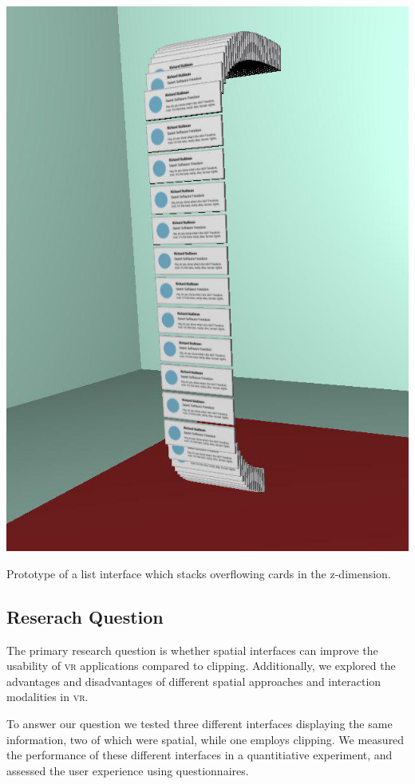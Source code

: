 \documentclass{tufte-book} %
\begin{document}
\begin{marginfigure}
  \includegraphics[width=\linewidth]{email.png}
  \caption{Prototype of a list interface which stacks overflowing cards in the z-dimension.}
  \label{fig:email}
\end{marginfigure}

\subsection{Reserach Question}
The primary research question is whether spatial interfaces can improve the usability of \textsc{vr} applications compared to clipping. Additionally, we explored the advantages and disadvantages of different spatial approaches and interaction modalities in \textsc{vr}.

To answer our question we tested three different interfaces displaying the same information, two of which were spatial, while one employs clipping. We measured the performance of these different interfaces in a quantitiative experiment, and assessed the user experience using questionnaires.
\end{document}
